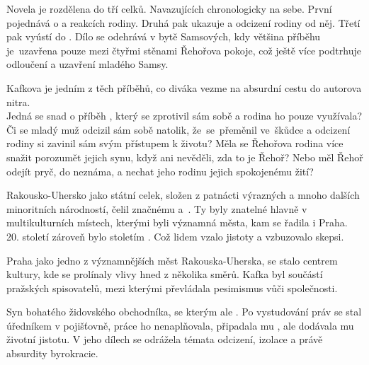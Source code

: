 \documentclass[FGBook.tex]{subfiles}
\begin{document}
\noindent Novela je rozdělena do tří celků.
Navazujících chronologicky na sebe.
První pojednává o  a reakcích rodiny.
Druhá pak ukazuje  a odcizení rodiny od něj.
Třetí pak vyústí do .
Dílo se odehrává v bytě Samsových,
kdy většina příběhu je~uzavřena pouze mezi čtyřmi stěnami Řehořova pokoje,
což ještě více podtrhuje odloučení a uzavření mladého Samsy.

\noindent Kafkova  je jedním z těch příběhů,
co diváka vezme na absurdní cestu do autorova nitra. \\
Jedná se snad o příběh , který se zprotivil sám sobě
a rodina ho pouze využívala?
Či se mladý muž odcizil sám sobě natolik, že~se~přeměnil ve~škůdce
a odcizení rodiny si zavinil sám svým přístupem k životu?
Měla se Řehořova rodina více snažit porozumět jejich synu,
když ani nevěděli, zda to je Řehoř?
Nebo měl Řehoř odejít pryč, do neznáma, a nechat jeho rodinu jejich spokojenému žití?


\noindent Rakousko-Uhersko jako státní celek,
složen z patnácti výrazných a mnoho dalších minoritních národností,
čelil značnému  a~.
Ty byly znatelné hlavně v multikulturních místech, kterými byli významná města, kam se řadila i Praha.
20. století zároveň bylo stoletím .
Což lidem vzalo jistoty a vzbuzovalo skepsi.

\noindent Praha jako jedno z významnějších měst Rakouska-Uherska, se stalo centrem kultury,
kde se prolínaly vlivy hned z několika směrů.
Kafka byl součástí pražských spisovatelů, mezi kterými převládala pesimismus vůči společnosti.



\noindent Syn bohatého židovského obchodníka, se kterým ale .
Po vystudování práv se stal úředníkem v pojišťovně, práce ho nenaplňovala,
připadala mu , ale dodávala mu životní jistotu.
V jeho dílech se odrážela témata odcizení, izolace a právě absurdity byrokracie.
\end{document}
